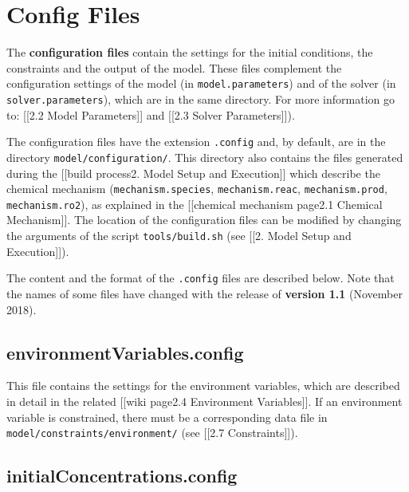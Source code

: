 \section{Config Files} \label{sec:config}

The \textbf{configuration files} contain the settings for the initial
conditions, the constraints and the output of the model. These files
complement the configuration settings of the model (in
\texttt{model.parameters}) and of the solver (in
\texttt{solver.parameters}), which are in the same directory. For more
information go to: {[}{[}2.2 Model Parameters{]}{]} and {[}{[}2.3 Solver
Parameters{]}{]}).

The configuration files have the extension \texttt{.config} and, by
default, are in the directory \texttt{model/configuration/}. This
directory also contains the files generated during the {[}{[}build
process\textbar{}2. Model Setup and Execution{]}{]} which describe the
chemical mechanism (\texttt{mechanism.species}, \texttt{mechanism.reac},
\texttt{mechanism.prod}, \texttt{mechanism.ro2}), as explained in the
{[}{[}chemical mechanism page\textbar{}2.1 Chemical Mechanism{]}{]}. The
location of the configuration files can be modified by changing the
arguments of the script \texttt{tools/build.sh} (see {[}{[}2. Model
Setup and Execution{]}{]}).

The content and the format of the \texttt{.config} files are described
below. Note that the names of some files have changed with the release
of \textbf{version 1.1} (November 2018).

\hypertarget{environmentvariables.config}{%
\subsection{environmentVariables.config}\label{environmentvariables.config}}

This file contains the settings for the environment variables, which are
described in detail in the related {[}{[}wiki page\textbar{}2.4
Environment Variables{]}{]}. If an environment variable is constrained,
there must be a corresponding data file in
\texttt{model/constraints/environment/} (see {[}{[}2.7
Constraints{]}{]}).

\hypertarget{initialconcentrations.config}{%
\subsection{initialConcentrations.config}\label{initialconcentrations.config}}

